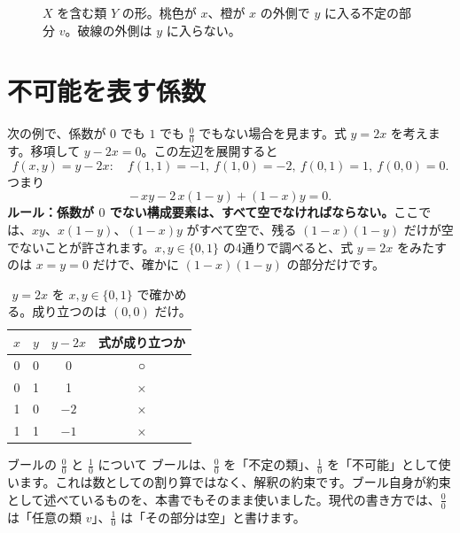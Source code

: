 \documentclass[a4paper,11pt,openany]{ltjsbook}
\begin{document}
\begin{figure}[htbp]
\centering
{}
\caption{$X$ を含む類 $Y$ の形。桃色が $x$、橙が $x$ の外側で $y$ に入る不定の部分 $v$。破線の外側は $y$ に入らない。}
\end{figure}

\section{不可能を表す係数}

次の例で、係数が $0$ でも $1$ でも $\tfrac00$ でもない場合を見ます。式 $y=2x$ を考えます。移項して $y-2x=0$。この左辺を展開すると
\[
f(x,y)=y-2x:\quad f(1,1)=-1,\ f(1,0)=-2,\ f(0,1)=1,\ f(0,0)=0 .
\]
つまり
\[
-\,xy-2\,x(1-y)+(1-x)y=0 .
\]
\textbf{ルール：係数が $0$ でない構成要素は、すべて空でなければならない。}ここでは、$xy$、$x(1-y)$、$(1-x)y$ がすべて空で、残る $(1-x)(1-y)$ だけが空でないことが許されます。$x,y\in\{0,1\}$ の4通りで調べると、式 $y=2x$ をみたすのは $x=y=0$ だけで、確かに $(1-x)(1-y)$ の部分だけです。

\begin{table}[htbp]
\centering
\begin{tabular}{cc|cc}
\toprule
$x$ & $y$ & $y-2x$ & 式が成り立つか\\
\midrule
0 & 0 & 0 & ○\\
0 & 1 & 1 & ×\\
1 & 0 & $-2$ & ×\\
1 & 1 & $-1$ & ×\\
\bottomrule
\end{tabular}
\caption{$y=2x$ を $x,y\in\{0,1\}$ で確かめる。成り立つのは $(0,0)$ だけ。}
\end{table}

\begin{notebox}{ブールの $\tfrac00$ と $\tfrac10$ について}
ブールは、$\tfrac00$ を「不定の類」、$\tfrac10$ を「不可能」として使います。これは数としての割り算ではなく、解釈の約束です。ブール自身が約束として述べているものを、本書でもそのまま使いました。現代の書き方では、$\tfrac00$ は「任意の類 $v$」、$\tfrac10$ は「その部分は空」と書けます。
\end{notebox}
\end{document}
